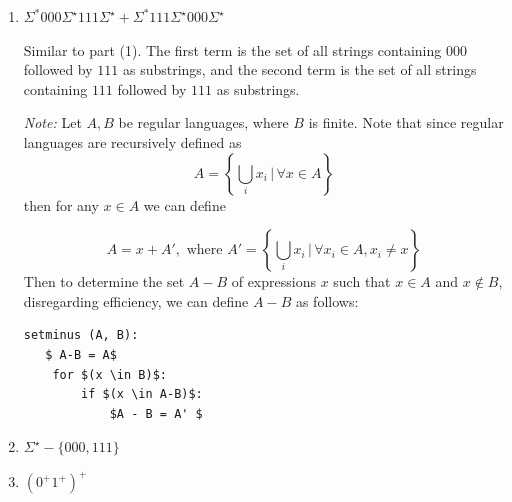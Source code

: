 \documentclass[12pt]{article}
\begin{document}
\begin{solution}
    \bbni    
    \begin{enumerate}

    \item[5.] $\Sigma^* 000 \Sigma^\star 111 \Sigma^\star + \Sigma^* 111 \Sigma^\star 000 \Sigma^\star$
        
        Similar to part (1).  The first term is the set of all strings containing $000$ followed by $111$ as substrings, and the second term is the set of all strings containing $111$ followed by $111$ as substrings. 

        \vspace{1em}

        \textit{Note:} Let $A, B$ be regular languages, where $B$ is finite. Note that since regular languages are recursively defined as 
        \[A = \left\{\underset{i}{\bigcup} x_i \, \big |\,  \forall x\in A\right\}\]
        then for any $x \in A$ we can define 

        \[A = x + A',\text{ where } A' =  \left\{\underset{i}{\bigcup} x_i \, \big |\,  \forall x_i\in A, x_i \neq x\right\}\] 
        Then to determine the set $A-B$ of expressions $x$ such that $x \in A$ and $x \notin B$, disregarding efficiency,  we can define $A - B$ as follows: 
        \vspace{1em}

    \begin{lstlisting}[mathescape]
setminus (A, B): 
   $ A-B = A$
    for $(x \in B)$: 
        if $(x \in A-B)$: 
            $A - B = A' $
    \end{lstlisting}
        \item[7.]$\Sigma^\star - \{000, 111\}$
        \item[8.] $(0^+1^+)^+$
    \end{enumerate}
\end{solution}
\end{document}
